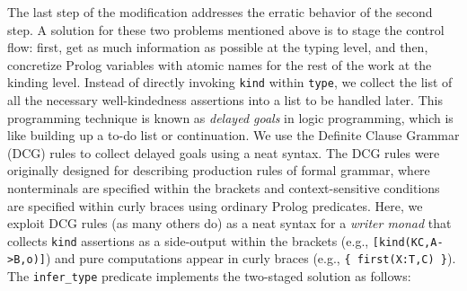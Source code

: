 \documentclass[runningheads,a4paper]{llncs}
\begin{document}
The last step of the modification addresses the erratic behavior of
the second step. A solution for these two problems mentioned above is
to stage the control flow: first, get as much information as possible
at the typing level, and then, concretize Prolog variables with atomic names
for the rest of the work at the kinding level. Instead of directly invoking
\verb|kind| within \verb|type|, we collect the list of all the necessary
well-kindedness assertions into a list to be handled later.
This programming technique is known as \emph{delayed goals}
in logic programming, which is like building up a to-do list or continuation.
We use the Definite Clause Grammar (DCG) rules \cite{PerWar80,SWIPrologManual}
to collect delayed goals using a neat syntax. The DCG rules were originally
designed for describing production rules of formal grammar, where nonterminals
are specified within the brackets and context-sensitive conditions are
specified within curly braces using ordinary Prolog predicates. Here,
we exploit DCG rules (as many others do) as a neat syntax for
a \emph{writer monad} that collects \texttt{kind} assertions
as a side-output within the brackets (e.g., \verb|[kind(KC,A->B,o)]|) and pure
computations appear in curly braces (e.g., \verb|{ first(X:T,C) }|).
The \verb|infer_type| predicate implements the two-staged solution
as follows:\vspace{-.5ex}
\end{document}

